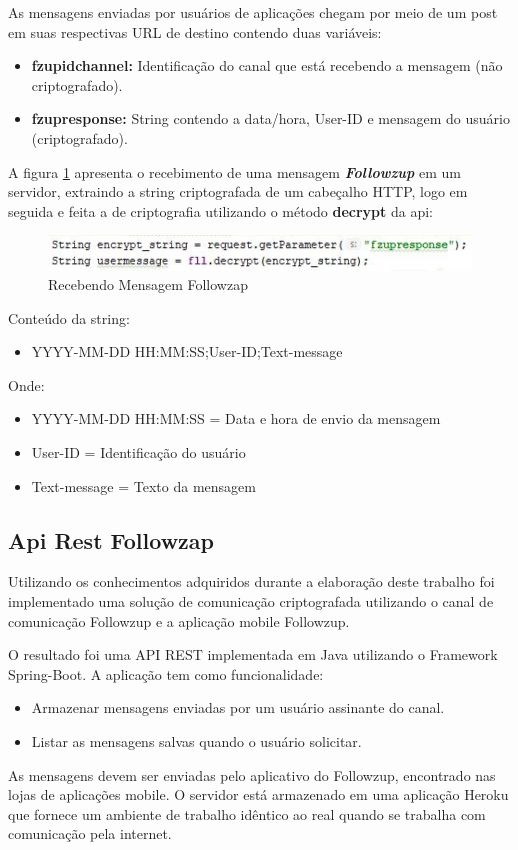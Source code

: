 \documentclass[12pt]{article}
\begin{document}
As mensagens enviadas por usuários de aplicações chegam por meio de um post em suas respectivas URL de destino contendo duas variáveis: 
\begin{itemize}
    \item \textbf{fzupidchannel:}  	Identificação do canal que está recebendo a mensagem (não criptografado).
    \item \textbf{fzupresponse:}  	String contendo a data/hora, User-ID e mensagem do usuário (criptografado). 
\end{itemize}

A figura \ref{java2} apresenta o recebimento de uma mensagem \textit{\textbf{Followzup }}em um servidor, extraindo a string criptografada de um cabeçalho HTTP, logo em seguida e feita a de criptografia utilizando o método \textbf{decrypt} da api:

 \begin{figure}[H]
 \centering
	\includegraphics[scale=1]{javacode2.JPG}
	\caption{Recebendo Mensagem Followzap}
	\label{java2}
\end{figure}


Conteúdo da string:
\begin{itemize}
\item YYYY-MM-DD HH:MM:SS;User-ID;Text-message
\end{itemize}


Onde:
\begin{itemize}
\item YYYY-MM-DD HH:MM:SS = Data e hora de envio da mensagem
\item User-ID = Identificação do usuário
\item Text-message = Texto da mensagem
\end{itemize}


\subsection{Api Rest Followzap}

Utilizando os conhecimentos adquiridos durante a elaboração deste trabalho foi implementado uma solução de comunicação criptografada utilizando o canal de comunicação Followzup e a aplicação mobile Followzup. 

O resultado foi uma API REST implementada em Java utilizando o Framework Spring-Boot. A aplicação tem como funcionalidade:
\begin{itemize}
 
\item  Armazenar mensagens enviadas por um usuário assinante do canal.
\item  Listar as mensagens salvas quando o usuário solicitar.
   
\end{itemize}{}
As mensagens devem ser enviadas pelo aplicativo do Followzup, encontrado nas lojas de aplicações mobile. O servidor está armazenado em uma aplicação Heroku que fornece um ambiente de trabalho idêntico ao real quando se trabalha com comunicação pela internet. 
\end{document}
